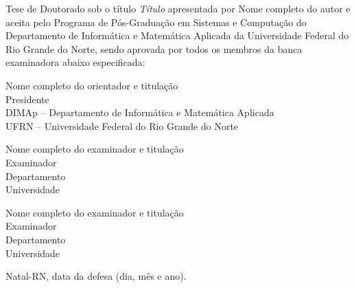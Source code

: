 \begin{folhadeaprovacao}
	\setlength{\ABNTsignthickness}{0.4pt}
	\setlength{\ABNTsignwidth}{10cm}
	
	\noindent 
	Tese de Doutorado sob o título \textit{Título} apresentada por Nome completo do autor e aceita pelo Programa de Pós-Graduação em Sistemas e Computação do Departamento de Informática e Matemática Aplicada da Universidade Federal do Rio Grande do Norte, sendo aprovada por todos os membros da banca examinadora abaixo especificada:
		
	\assinatura
	{
		Nome completo do orientador e titulação   			                  \\
		{\small Presidente}											          \smallskip\\ 
		{\footnotesize
			DIMAp -- Departamento de Informática e Matemática Aplicada		   \\
		  	UFRN -- Universidade Federal do Rio Grande do Norte
		}
   }
      
   \assinatura
	{
      Nome completo do examinador e titulação   			                  \\
		{\small Examinador}											          \smallskip\\ 
		{\footnotesize
			Departamento		\\
		  	Universidade
		}
   }   
   
   \assinatura
	{
      Nome completo do examinador e titulação   			                  \\
		{\small Examinador}											          \smallskip\\ 
		{\footnotesize
			Departamento		\\
		  	Universidade
		}
	}
		
	\vfill
	
	\begin{center}
		Natal-RN, data da defesa (dia, mês e ano).
	\end{center}
\end{folhadeaprovacao}
